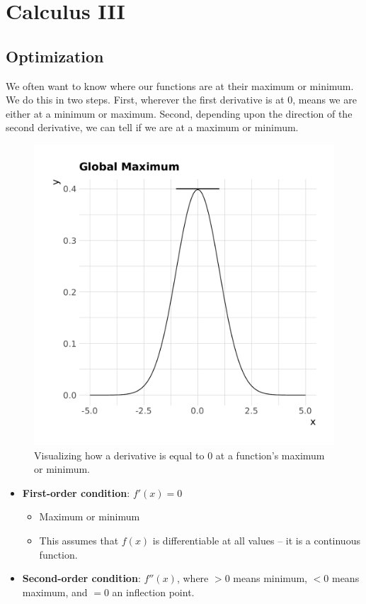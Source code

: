\section{Calculus III}

\subsection{Optimization}

We often want to know where our functions are at their maximum or minimum. We do this in two steps. First, wherever the first derivative is at 0, means we are either at a minimum or maximum. Second, depending upon the direction of the second derivative, we can tell if we are at a maximum or minimum. 

\begin{figure}[ht]
    \centering
    \includegraphics[scale = 0.55]{figures/optim.pdf}
    \caption{Visualizing how a derivative is equal to 0 at a function's maximum or minimum.}
    \label{fig:optim}
\end{figure}

\begin{itemize}
    \item \textbf{First-order condition}: $f'(x) = 0$
    \begin{itemize}
        \item Maximum or minimum
        \item This assumes that $f(x)$ is differentiable at all values -- it is a continuous function.
    \end{itemize}
    \item \textbf{Second-order condition}: $f''(x)$, where $>0$ means minimum, $<0$ means maximum, and $=0$ an inflection point.
\end{itemize}

